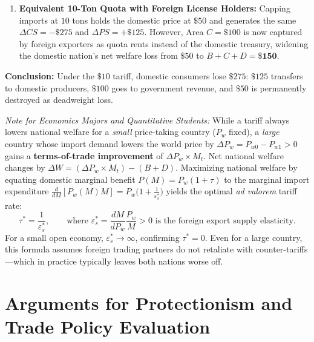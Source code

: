 \documentclass[11pt,letterpaper]{article}
\begin{document}
\begin{tcolorbox}[colback=LightSlate,colframe=CourseBlue,title=\textbf{Work It Out 14.2: Welfare Impact of a \$10 Steel Tariff vs. a 10-Ton Quota}]
\begin{enumerate}
    \item \textbf{Equivalent 10-Ton Quota with Foreign License Holders:}
    Capping imports at $10$ tons holds the domestic price at $\$50$ and generates the same $\Delta CS = -\$275$ and $\Delta PS = +\$125$. However, Area $C = \$100$ is now captured by foreign exporters as quota rents instead of the domestic treasury, widening the domestic nation's net welfare loss from $\$50$ to $B + C + D = \mathbf{\$150}$.
\end{enumerate}
\textbf{Conclusion:} Under the $\$10$ tariff, domestic consumers lose $\$275$: $\$125$ transfers to domestic producers, $\$100$ goes to government revenue, and $\$50$ is permanently destroyed as deadweight loss.
\end{tcolorbox}

\begin{tcolorbox}[colback=SlateBlue!5!white,colframe=SlateBlue,title=\textbf{Optional Advanced Calculus Extension: Optimal Tariff for a Large Country}]
\small
\emph{Note for Economics Majors and Quantitative Students:}
While a tariff always lowers national welfare for a \emph{small} price-taking country ($P_w$ fixed), a \emph{large} country whose import demand lowers the world price by $\Delta P_w = P_{w0} - P_{w1} > 0$ gains a \textbf{terms-of-trade improvement} of $\Delta P_w \times M_t$. Net national welfare changes by $\Delta W = (\Delta P_w \times M_t) - (B + D)$. Maximizing national welfare by equating domestic marginal benefit $P(M) = P_w(1 + \tau)$ to the marginal import expenditure $\frac{d}{dM}[P_w(M)M] = P_w\bigl(1 + \frac{1}{\varepsilon_s^*}\bigr)$ yields the optimal \emph{ad valorem} tariff rate:
\[
\tau^* = \frac{1}{\varepsilon_s^*}, \qquad \text{where } \varepsilon_s^* = \frac{dM}{dP_w}\frac{P_w}{M} > 0 \text{ is the foreign export supply elasticity.}
\]
For a small open economy, $\varepsilon_s^* \to \infty$, confirming $\tau^* = 0$. Even for a large country, this formula assumes foreign trading partners do not retaliate with counter-tariffs---which in practice typically leaves both nations worse off.
\end{tcolorbox}

\section{Arguments for Protectionism and Trade Policy Evaluation}
\end{document}
